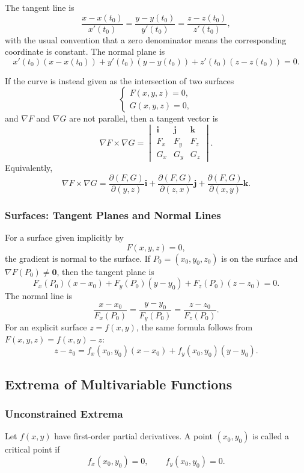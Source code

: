 The tangent line is
\[
    \frac{x-x(t_0)}{x'(t_0)}=\frac{y-y(t_0)}{y'(t_0)}=\frac{z-z(t_0)}{z'(t_0)},
\]
with the usual convention that a zero denominator means the corresponding coordinate is constant. The normal plane is
\[
    x'(t_0)(x-x(t_0))+y'(t_0)(y-y(t_0))+z'(t_0)(z-z(t_0))=0.
\]

If the curve is instead given as the intersection of two surfaces
\[
\begin{cases}
    F(x,y,z)=0,\\
    G(x,y,z)=0,
\end{cases}
\]
and $\nabla F$ and $\nabla G$ are not parallel, then a tangent vector is
\[
    \nabla F\times \nabla G
    =\begin{vmatrix}
    \mathbf{i}&\mathbf{j}&\mathbf{k}\\
    F_x&F_y&F_z\\
    G_x&G_y&G_z
    \end{vmatrix}.
\]
Equivalently,
\[
    \nabla F\times\nabla G
    =\frac{\partial(F,G)}{\partial(y,z)}\mathbf{i}
    +\frac{\partial(F,G)}{\partial(z,x)}\mathbf{j}
    +\frac{\partial(F,G)}{\partial(x,y)}\mathbf{k}.
\]

\subsubsection{Surfaces: Tangent Planes and Normal Lines}

For a surface given implicitly by
\[
    F(x,y,z)=0,
\]
the gradient is normal to the surface. If $P_0=(x_0,y_0,z_0)$ is on the surface and $\nabla F(P_0)\ne\mathbf{0}$, then the tangent plane is
\[
    F_x(P_0)(x-x_0)+F_y(P_0)(y-y_0)+F_z(P_0)(z-z_0)=0.
\]
The normal line is
\[
    \frac{x-x_0}{F_x(P_0)}=\frac{y-y_0}{F_y(P_0)}=\frac{z-z_0}{F_z(P_0)}.
\]
For an explicit surface $z=f(x,y)$, the same formula follows from $F(x,y,z)=f(x,y)-z$:
\[
    z-z_0=f_x(x_0,y_0)(x-x_0)+f_y(x_0,y_0)(y-y_0).
\]

\subsection{Extrema of Multivariable Functions}

\subsubsection{Unconstrained Extrema}

\begin{definition}
Let $f(x,y)$ have first-order partial derivatives. A point $(x_0,y_0)$ is called a critical point if
\[
    f_x(x_0,y_0)=0,
    \qquad
    f_y(x_0,y_0)=0.
\]
\end{definition}

